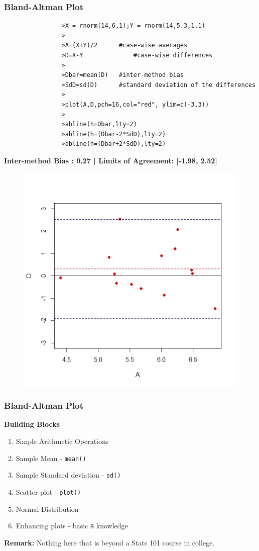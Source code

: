 \documentclass[compress]{beamer}        %
\begin{document}
		\begin{frame}[fragile]
			\frametitle{Bland-Altman Plot}
			\vspace{-0.3cm}
			\begin{framed}
				\begin{verbatim}
				>X = rnorm(14,6,1);Y = rnorm(14,5.3,1.1)
				>
				>A=(X+Y)/2		#case-wise averages
				>D=X-Y			    #case-wise differences
				>		
				>Dbar=mean(D)	#inter-method bias
				>SdD=sd(D)		#standard deviation of the differences
				>
				>plot(A,D,pch=16,col="red", ylim=c(-3,3))
				>
				>abline(h=Dbar,lty=2)
				>abline(h=(Dbar-2*SdD),lty=2)
				>abline(h=(Dbar+2*SdD),lty=2)
				\end{verbatim}
			\end{framed}
		\end{frame}
		\begin{frame}
			\vspace{-0.1cm}
			\textbf{Inter-method Bias : 0.27 | Limits of Agreement: [-1.98, 2.52]}
			\vspace{-0.2cm}
			\begin{figure}
				\centering
				\includegraphics[width=0.7\linewidth]{images/NewBAplot2}
				\label{fig:SimpleBAplot2}
			\end{figure}
			
			
		\end{frame}
		\begin{frame}[fragile]
			\frametitle{Bland-Altman Plot}
			\vspace{-0.2cm}
			\large
			\textbf{Building Blocks}
			\begin{enumerate}
				\item Simple Arithmetic Operations
				\item Sample Mean  - \texttt{mean()}
				\item Sample Standard deviation - \texttt{sd()}
				\item Scatter plot  - \texttt{plot()}
				\item Normal Distribution 
				\item Enhancing plots  - basic \texttt{R} knowledge 
			\end{enumerate}
			\bigskip
			\textbf{Remark:} Nothing here that is beyond a Stats 101 course in college.
		\end{frame}
\end{document}
